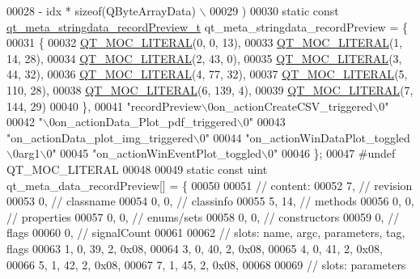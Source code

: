 \begin{DoxyCode}
00028 \textcolor{preprocessor}{        - idx * sizeof(QByteArrayData) \(\backslash\)}
00029 \textcolor{preprocessor}{    )}
00030 \textcolor{keyword}{static} \textcolor{keyword}{const} \hyperlink{a00068_dd/dc1/a00212}{qt\_meta\_stringdata\_recordPreview\_t} 
      qt\_meta\_stringdata\_recordPreview = \{
00031     \{
00032 \hyperlink{a00068_a75bb9482d242cde0a06c9dbdc6b83abe}{QT\_MOC\_LITERAL}(0, 0, 13),
00033 \hyperlink{a00068_a75bb9482d242cde0a06c9dbdc6b83abe}{QT\_MOC\_LITERAL}(1, 14, 28),
00034 \hyperlink{a00068_a75bb9482d242cde0a06c9dbdc6b83abe}{QT\_MOC\_LITERAL}(2, 43, 0),
00035 \hyperlink{a00068_a75bb9482d242cde0a06c9dbdc6b83abe}{QT\_MOC\_LITERAL}(3, 44, 32),
00036 \hyperlink{a00068_a75bb9482d242cde0a06c9dbdc6b83abe}{QT\_MOC\_LITERAL}(4, 77, 32),
00037 \hyperlink{a00068_a75bb9482d242cde0a06c9dbdc6b83abe}{QT\_MOC\_LITERAL}(5, 110, 28),
00038 \hyperlink{a00068_a75bb9482d242cde0a06c9dbdc6b83abe}{QT\_MOC\_LITERAL}(6, 139, 4),
00039 \hyperlink{a00068_a75bb9482d242cde0a06c9dbdc6b83abe}{QT\_MOC\_LITERAL}(7, 144, 29)
00040     \},
00041     \textcolor{stringliteral}{"recordPreview\(\backslash\)0on\_actionCreateCSV\_triggered\(\backslash\)0"}
00042     \textcolor{stringliteral}{"\(\backslash\)0on\_actionData\_Plot\_pdf\_triggered\(\backslash\)0"}
00043     \textcolor{stringliteral}{"on\_actionData\_plot\_img\_triggered\(\backslash\)0"}
00044     \textcolor{stringliteral}{"on\_actionWinDataPlot\_toggled\(\backslash\)0arg1\(\backslash\)0"}
00045     \textcolor{stringliteral}{"on\_actionWinEventPlot\_toggled\(\backslash\)0"}
00046 \};
00047 \textcolor{preprocessor}{#undef QT\_MOC\_LITERAL}
00048 
00049 \textcolor{keyword}{static} \textcolor{keyword}{const} uint qt\_meta\_data\_recordPreview[] = \{
00050 
00051  \textcolor{comment}{// content:}
00052        7,       \textcolor{comment}{// revision}
00053        0,       \textcolor{comment}{// classname}
00054        0,    0, \textcolor{comment}{// classinfo}
00055        5,   14, \textcolor{comment}{// methods}
00056        0,    0, \textcolor{comment}{// properties}
00057        0,    0, \textcolor{comment}{// enums/sets}
00058        0,    0, \textcolor{comment}{// constructors}
00059        0,       \textcolor{comment}{// flags}
00060        0,       \textcolor{comment}{// signalCount}
00061 
00062  \textcolor{comment}{// slots: name, argc, parameters, tag, flags}
00063        1,    0,   39,    2, 0x08,
00064        3,    0,   40,    2, 0x08,
00065        4,    0,   41,    2, 0x08,
00066        5,    1,   42,    2, 0x08,
00067        7,    1,   45,    2, 0x08,
00068 
00069  \textcolor{comment}{// slots: parameters}

\end{DoxyCode}

